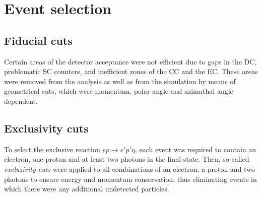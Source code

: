 \documentclass[prc,aps,floatfix,showpacs,showkeys,twocolumn,superscriptaddress,letterpaper,10pt]{revtex4-1}
\begin{document}
\section{Event selection}

 

\subsection{Fiducial cuts}
Certain areas of the detector acceptance were not efficient due to  gaps in the DC,
problematic SC counters, and inefficient zones of the CC and the EC. These areas were removed from the analysis as well as from the simulation by means of geometrical cuts,  which were momentum, polar angle and azimuthal angle dependent.



\subsection{Exclusivity cuts}
\label{sect:exclusivity_cuts}

To select the exclusive reaction $ep\rightarrow e'p'\eta$, each event was required to contain an electron, one proton and at least two photons in the final state. Then,  so called {\it exclusivity cuts} were applied to all combinations of an electron,  a proton and two  photons  to ensure energy and momentum conservation, thus eliminating events in which there were any additional undetected particles.
\end{document}
